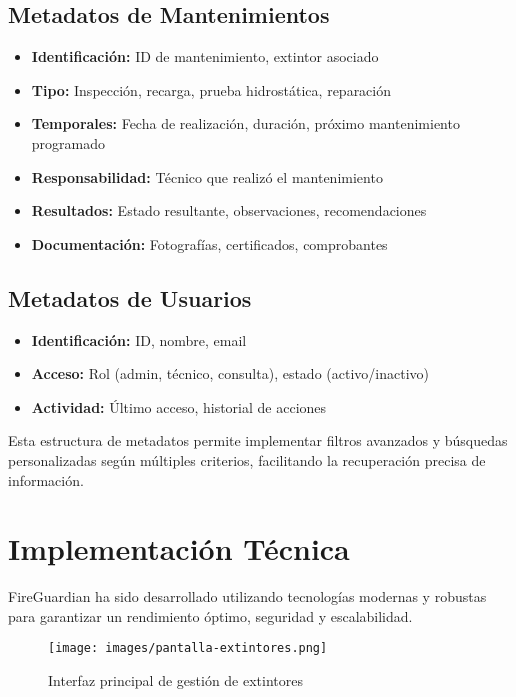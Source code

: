 \documentclass[11pt,a4paper]{article}
\begin{document}
\subsection{Metadatos de Mantenimientos}

\begin{itemize}
    \item \textbf{Identificación:} ID de mantenimiento, extintor asociado
    \item \textbf{Tipo:} Inspección, recarga, prueba hidrostática, reparación
    \item \textbf{Temporales:} Fecha de realización, duración, próximo mantenimiento programado
    \item \textbf{Responsabilidad:} Técnico que realizó el mantenimiento
    \item \textbf{Resultados:} Estado resultante, observaciones, recomendaciones
    \item \textbf{Documentación:} Fotografías, certificados, comprobantes
\end{itemize}

\subsection{Metadatos de Usuarios}

\begin{itemize}
    \item \textbf{Identificación:} ID, nombre, email
    \item \textbf{Acceso:} Rol (admin, técnico, consulta), estado (activo/inactivo)
    \item \textbf{Actividad:} Último acceso, historial de acciones
\end{itemize}

Esta estructura de metadatos permite implementar filtros avanzados y búsquedas personalizadas según múltiples criterios, facilitando la recuperación precisa de información.

\section{Implementación Técnica}

FireGuardian ha sido desarrollado utilizando tecnologías modernas y robustas para garantizar un rendimiento óptimo, seguridad y escalabilidad.

\begin{figure}[h]
    \centering
    \texttt{[image: images/pantalla-extintores.png]}
    \caption{Interfaz principal de gestión de extintores}
    \label{fig:pantalla-extintores}
\end{figure}
\end{document}
